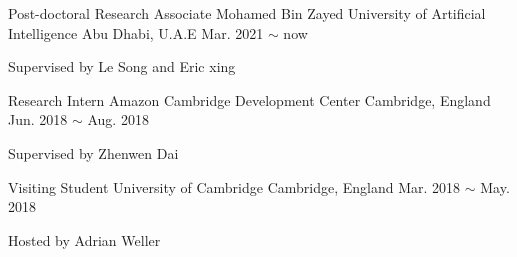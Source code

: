 

\begin{cventries}

  \cventry
    {Post-doctoral Research Associate}
    {Mohamed Bin Zayed University of Artificial Intelligence}
    {Abu Dhabi, U.A.E}
    {Mar. 2021 $\sim$ now}
    {
    \begin{cvitems} %
        \item{Supervised by Le Song and Eric xing}
    \end{cvitems}
    }
\vspace{.1in}

  \cventry
    {Research Intern}
    {Amazon Cambridge Development Center}
    {Cambridge, England}
    {Jun. 2018 $\sim$ Aug. 2018}
    {
    \begin{cvitems} %
        \item{Supervised by Zhenwen Dai}
    \end{cvitems}
    }
    \vspace{.1in}

  \cventry
    {Visiting Student}
    {University of Cambridge}
    {Cambridge, England}
    {Mar. 2018 $\sim$ May. 2018}
    {
    \begin{cvitems} %
        \item{Hosted by Adrian Weller}
    \end{cvitems}
    }
    \vspace{.1in}


\end{cventries}
